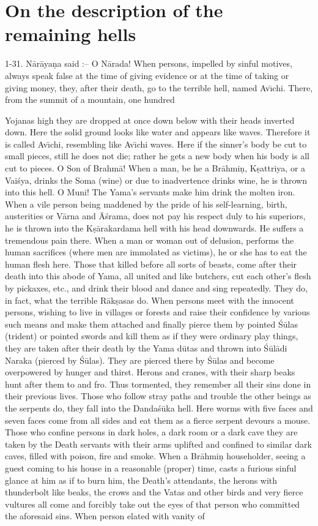 \chapter{On the description of the remaining hells}

1-31. N\=ar\=aya\d{n}a said :-- O N\=arada! When persons, impelled by sinful motives, always speak false at the time of giving evidence or at the time of taking or giving money, they, after their death, go to the terrible hell, named Av\={\i}chi. There, from the summit of a mountain, one hundred

Yojanas high they are dropped at once down below with their heads inverted down. Here the solid ground looks like water and appears like waves. Therefore it is called Av\={\i}chi, resembling like Av\={\i}chi waves. Here if the sinner's body be cut to small pieces, still he does not die; rather he gets a new body when his body is all cut to pieces. O Son of Brahm\=a! When a man, be he a Br\=ahmi\d{n}, K\d{s}attriya, or a Vai\'sya, drinks the Soma (wine) or due to inadvertence drinks wine, he is thrown into this hell. O Muni! The Yama's servants make him drink the molten iron. When a vile person being maddened by the pride of his self-learning, birth, austerities or V\=arna and \=A\'srama, does not pay his respect duly to his superiors, he is thrown into the K\d{s}\=arakardama hell with his head downwards. He suffers a tremendous pain there. When a man or woman out of delusion, performs the human sacrifices (where men are immolated as victims), he or she has to eat the human flesh here. Those that killed before all sorts of beasts, come after their death into this abode of Yama, all united and like butchers, cut each other's flesh by pickaxes, etc., and drink their blood and dance and sing repeatedly. They do, in fact, what the terrible R\=ak\d{s}asas do. When persons meet with the innocent persons, wishing to live in villages or forests and raise their confidence by various such means and make them attached and finally pierce them by pointed \'S\=ulas (trident) or pointed swords and kill them as if they were ordinary play things, they are taken after their death by the Yama d\=utas and thrown into \'S\=ul\=adi Naraka (pierced by \'S\=ulas). They are pierced there by \'S\=ulas and become overpowered by hunger and thirst. Herons and cranes, with their sharp beaks hunt after them to and fro. Thus tormented, they remember all their sins done in their previous lives. Those who follow stray paths and trouble the other beings as the serpents do, they fall into the Danda\'s\=uka hell. Here worms with five faces and seven faces come from all sides and eat them as a fierce serpent devours a mouse. Those who confine persons in dark holes, a dark room or a dark cave they are taken by the Death servants with their arms uplifted and confined to similar dark caves, filled with poison, fire and smoke. When a Br\=ahmi\d{n} householder, seeing a guest coming to his house in a reasonable (proper) time, casts a furious sinful glance at him as if to burn him, the Death's attendants, the herons with thunderbolt like beaks, the crows and the Vatas and other birds and very fierce vultures all come and forcibly take out the eyes of that person who committed the aforesaid sins. When person elated with vanity of 